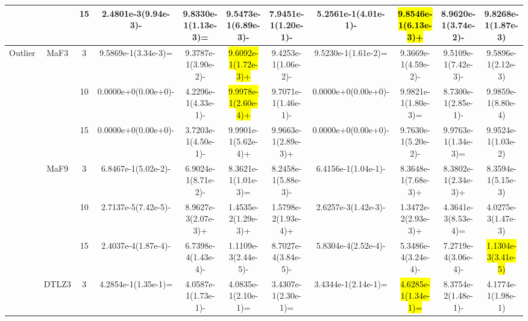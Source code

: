 \documentclass[a4paper,fleqn]{cas-dc}
\newcommand{\highlight}[1]{
	\begingroup
	\sethlcolor{Seashell}%
	\hl{#1}%
	\endgroup
}
\begin{document}
\begin{sloppypar}
\begin{table}[ht]
{\begin{tabular}{ccccccccccc}
					\multirow{9}{*}{~}&\multirow{3}{*}{~} &15 &2.4801e-3(9.94e-3)-		&9.8330e-1(1.13e-3)=	&9.5473e-1(6.89e-3)-	&7.9451e-1(1.20e-1)-	&5.2561e-1(4.01e-1)-	&\highlight{9.8546e-1(6.13e-3)+}	&8.9620e-1(3.74e-2)-	&9.8268e-1(1.87e-3)\\
					
					
					
					
					
					\midrule[0.35pt]
					\multirow{9}{*}{Outlier}&\multirow{3}{*}{MaF3} &3 &9.5869e-1(3.34e-3)=		&9.3787e-1(3.90e-2)-	&\highlight{9.6092e-1(1.72e-3)+}	&9.4253e-1(1.06e-2)-	&9.5230e-1(1.61e-2)=	&9.3669e-1(4.59e-2)-	&9.5109e-1(7.42e-3)-	&9.5896e-1(2.12e-3)\\ 
					
					\multirow{9}{*}{~}&\multirow{3}{*}{~} &10 &0.0000e+0(0.00e+0)-		&4.2296e-1(4.33e-1)-	&\highlight{9.9978e-1(2.60e-4)+}	&9.7071e-1(1.46e-1)-	&0.0000e+0(0.00e+0)-	&9.9821e-1(1.80e-3)=	&8.7300e-1(2.85e-1)-	&9.9859e-1(8.80e-4)\\
					
					\multirow{9}{*}{~}&\multirow{3}{*}{~} &15 &0.0000e+0(0.00e+0)-	&3.7203e-1(4.50e-1)-	&9.9901e-1(5.62e-4)+	&9.9663e-1(2.89e-3)+	&0.0000e+0(0.00e+0)-	&9.7630e-1(5.20e-2)-	&9.9763e-1(1.34e-3)=	&9.9524e-1(1.03e-2)\\
					
					
					
					
					
					\multirow{9}{*}{~}&\multirow{3}{*}{MaF9} &3 &6.8467e-1(5.02e-2)-		&6.9024e-1(8.71e-2)-	&8.3621e-1(1.01e-3)=	&8.2458e-1(5.88e-3)-	&6.4156e-1(1.04e-1)-	&8.3648e-1(7.68e-3)+	&8.3802e-1(2.34e-3)+	&8.3594e-1(5.15e-3)\\ 
					
					\multirow{9}{*}{~}&\multirow{3}{*}{~} &10 	&2.7137e-5(7.42e-5)-		&8.9627e-3(2.07e-3)+	&1.4535e-2(1.29e-3)+	&1.5798e-2(1.93e-4)+	&2.6257e-3(1.42e-3)-	&1.3472e-2(2.93e-3)+	&4.3641e-3(8.53e-4)=	&4.0275e-3(1.47e-3)\\
					
					\multirow{9}{*}{~}&\multirow{3}{*}{~} &15 &2.4037e-4(1.87e-4)-	&6.7398e-4(1.43e-4)-	&1.1109e-3(2.44e-5)-	&8.7027e-4(3.84e-5)-	&5.8304e-4(2.52e-4)-	&5.3486e-4(3.24e-4)-	&7.2719e-4(3.06e-4)-	&\highlight{1.1304e-3(3.41e-5)}\\
					
					
					
					
					
					
					\multirow{9}{*}{~}&\multirow{3}{*}{DTLZ3} &3 &4.2854e-1(1.35e-1)=	&4.0587e-1(1.73e-1)-	&4.0835e-1(2.10e-1)=	&3.4307e-1(2.30e-1)=	&3.4344e-1(2.14e-1)=	&\highlight{4.6285e-1(1.34e-1)=}	&8.3754e-2(1.48e-1)-	&4.1774e-1(1.98e-1)\\ 
					

\end{tabular}}
\end{table}
\end{sloppypar}
\end{document}

